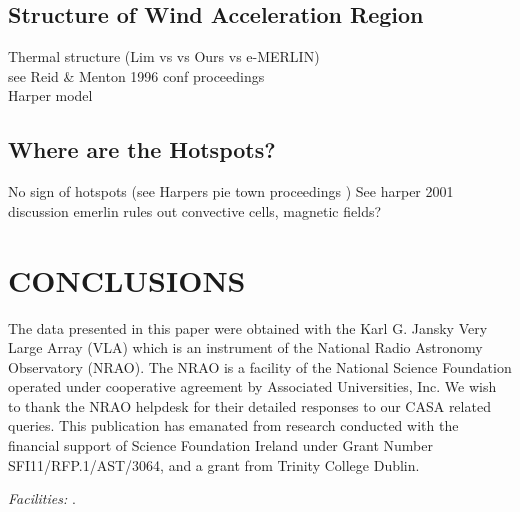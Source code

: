 \documentclass[iop]{emulateapj}
\begin{document}
\subsection{Structure of Wind Acceleration Region} 
Thermal structure (Lim vs vs Ours vs e-MERLIN)\\
see Reid \& Menton 1996 conf proceedings\\
Harper model

\subsection{Where are the Hotspots?}

No sign of hotspots (see Harpers pie town proceedings )
See harper 2001 discussion	
emerlin rules out convective cells, magnetic fields?





\section{CONCLUSIONS}
 


\acknowledgments
The data presented in this paper were obtained with the Karl G. Jansky Very Large Array (VLA) which is an instrument of the National Radio Astronomy Observatory (NRAO). The NRAO is a facility of the National Science Foundation operated under cooperative agreement by Associated Universities, Inc. We wish to thank the NRAO helpdesk for their detailed responses to our CASA related queries. This publication has emanated from research conducted with the financial support of Science Foundation Ireland under Grant Number SFI11/RFP.1/AST/3064, and a grant from Trinity College Dublin.

{\it Facilities:} .




\end{document}
